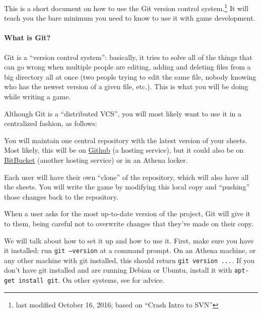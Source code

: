 \documentclass[green]{testgame}
\begin{document}
\newcommand{\ter}[1]{\fbox{\parbox{6.5in}{{\tt #1}}}}




This is a short document on how to use the Git version control
system.\footnote{last modified October 16, 2016; based on ``Crash Intro to SVN''} It will teach you the
bare minimum you need to know to use it with game development.

\paragraph*{What is Git?}

Git is a ``version control system'': basically,
it tries to solve all of the things that can go wrong when multiple
people are editing, adding and deleting files from a big directory all
at once (two people trying to edit the same file, nobody knowing who
has the newest version of a given file, etc.). This is what you will
be doing while writing a game.

Although Git is a ``distributed VCS'', you will most likely want to use it in a centralized fashion, as follows:


\begin{itemz}[]

\item You will maintain one central repository with the latest version of your sheets. Most likely, this will be on \href{https://github.com}{Github} (a hosting service), but it could also be on \href{https://bitbucket.org/}{BitBucket} (another hosting service) or in an Athena locker.

\item Each user will have their own ``clone'' of the repository, which will also have all the sheets. You will write the game by modifying this local copy and ``pushing'' those changes back to the repository.

\item When a user asks for the most up-to-date version of the project, Git will give it to them, being careful not to overwrite changes that they've made on their copy.

\end{itemz}

We will talk about how to set it up and how to use it. First, make sure you have it installed: run \texttt{git --version} at a command prompt. On an Athena machine, or any other machine with git installed, this should return \texttt{git version \textit{...}}. If you don't have git installed and are running Debian or Ubuntu, install it with \texttt{apt-get install git}. On other systems, see  for advice.
\end{document}
